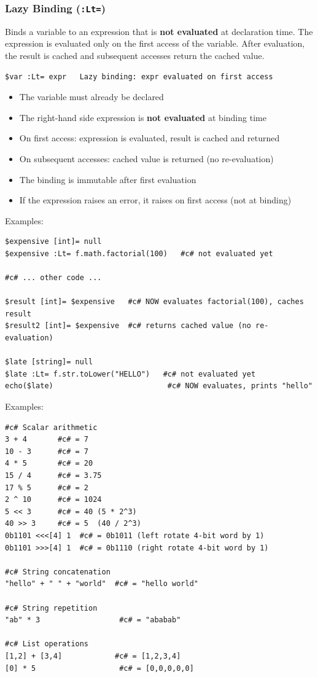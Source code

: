 \subsubsection{Lazy Binding (\texttt{:Lt=})}
Binds a variable to an expression that is \textbf{not evaluated} at declaration time. The expression is evaluated only on the first access of the variable. After evaluation, the result is cached and subsequent accesses return the cached value.
\begin{verbatim}
$var :Lt= expr   Lazy binding: expr evaluated on first access
\end{verbatim}
\begin{itemize}
\item The variable must already be declared
\item The right-hand side expression is \textbf{not evaluated} at binding time
\item On first access: expression is evaluated, result is cached and returned
\item On subsequent accesses: cached value is returned (no re-evaluation)
\item The binding is immutable after first evaluation
\item If the expression raises an error, it raises on first access (not at binding)
\end{itemize}

Examples:
\begin{verbatim}
$expensive [int]= null
$expensive :Lt= f.math.factorial(100)   #c# not evaluated yet

#c# ... other code ...

$result [int]= $expensive   #c# NOW evaluates factorial(100), caches result
$result2 [int]= $expensive  #c# returns cached value (no re-evaluation)

$late [string]= null
$late :Lt= f.str.toLower("HELLO")   #c# not evaluated yet
echo($late)                          #c# NOW evaluates, prints "hello"
\end{verbatim}

Examples:
\begin{verbatim}
#c# Scalar arithmetic
3 + 4       #c# = 7
10 - 3      #c# = 7
4 * 5       #c# = 20
15 / 4      #c# = 3.75
17 % 5      #c# = 2
2 ^ 10      #c# = 1024
5 << 3      #c# = 40 (5 * 2^3)
40 >> 3     #c# = 5  (40 / 2^3)
0b1101 <<<[4] 1  #c# = 0b1011 (left rotate 4-bit word by 1)
0b1101 >>>[4] 1  #c# = 0b1110 (right rotate 4-bit word by 1)

#c# String concatenation
"hello" + " " + "world"  #c# = "hello world"

#c# String repetition
"ab" * 3                  #c# = "ababab"

#c# List operations
[1,2] + [3,4]            #c# = [1,2,3,4]
[0] * 5                   #c# = [0,0,0,0,0]
\end{verbatim}

